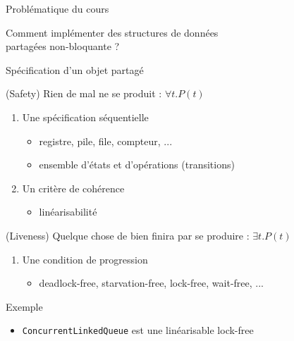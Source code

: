 
\begingroup

\begin{frame}{Problématique du cours}

  \begin{center}
    \alert{Comment implémenter des structures de données \\partagées non-bloquante ?}
  \end{center}
  
  \begin{block}{Spécification d'un objet partagé}
    \begin{description}[Vivacité :]
    \item[Sûreté :] (Safety) Rien de mal ne se produit : $\forall t. P(t)$
      \begin{enumerate}
      \item Une spécification séquentielle
        \begin{itemize}
        \item registre, pile, file, compteur, ...
        \item ensemble d'états et d'opérations (transitions)
        \end{itemize}
      \item Un critère de cohérence
        \begin{itemize}
        \item \alert{linéarisabilité}
        \end{itemize}
      \end{enumerate}
    \item[Vivacité :] (Liveness) Quelque chose de bien finira par se produire : $\exists t. P(t)$
      \begin{enumerate}[3.]
      \item Une condition de progression
        \begin{itemize}
        \item deadlock-free, starvation-free, \alert{lock-free}, \alert{wait-free}, ...
        \end{itemize}
      \end{enumerate}
    \end{description}
  \end{block}
  
  \begin{exampleblock}{Exemple}
    \begin{itemize}
    \item \lstinline{ConcurrentLinkedQueue} est une  \alert{linéarisable} {\color{exampleColor}lock-free}
    \end{itemize}
  \end{exampleblock}
  
\end{frame}

\endgroup
\endinput
